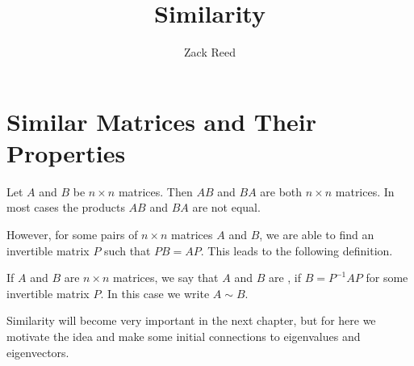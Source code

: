 \documentclass{ximera}
\author{Zack Reed}
\title{Similarity}
\begin{document}
\begin{abstract}

\end{abstract}
\maketitle

\section*{Similar Matrices and Their Properties}
 
Let $A$ and $B$ be $n \times n$ matrices. Then $AB$ and $BA$ are both $n \times n$ matrices.  In most cases the products $AB$ and $BA$ are not equal.
 
However, for some pairs of $n \times n$ matrices $A$ and $B$, we are able to find an invertible matrix $P$ such that $PB = AP$.  This leads to the following definition.
 
\begin{definition}\label{def:similar}
If $A$ and $B$ are $n \times n$ matrices, we say that $A$ and $B$ are , if $B = P^{-1}AP$ for some invertible matrix $P$.  In this case we write $A \sim B$.
\end{definition}

Similarity will become very important in the next chapter, but for here we motivate the idea and make some initial connections to eigenvalues and eigenvectors.

  
 
 
 
\end{document}
